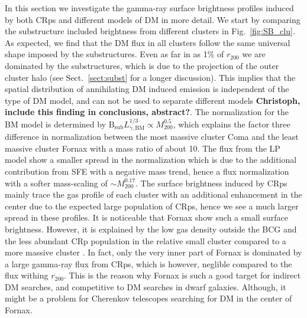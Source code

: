 \documentclass[10pt,aps,pra,reprint,amsmath,amsfonts,amssymb,showpacs,nofootinbib,floatfix]{revtex4-1}
\newcommand{\rmn}{\mathrm}
\newcommand{\B}{\rmn{B}}
\newcommand{\bsub}{\B_\rmn{sub}}
\newcommand{\rvir}{r_{200}}
\newcommand{\mvir}{M_{200}}
\begin{document}
In this section we investigate the gamma-ray surface brightness
profiles induced by both CRps and different models of DM in more
detail. We start by comparing the substructure included brightness
from different clusters in Fig.~\ref{fig:SB_clu}. As expected, we find
that the DM flux in all clusters follow the same universal shape
imposed by the substructures. Even as far in as 1\% of $\rvir$ we are
dominated by the substructures, which is due to the projection of the
outer cluster halo (see Sect.~\ref{sect:subst} for a longer
discussion). This implies that the spatial distribution of
annihilating DM induced emission is independent of the type of DM
model, and can not be used to separate different models {\bf
  Christoph, include this finding in conclusions, abstract?}. The
normalization for the BM model is determined by $\bsub
L_{\gamma,\rmn{BM}}^{1/3} \propto \mvir^{0.5}$, which explains the
factor three difference in normalization between the most massive
cluster Coma and the least massive cluster Fornax with a mass ratio of
about 10. The flux from the LP model show a smaller spread in the
normalization which is due to the additional contribution from SFE
with a negative mass trend, hence a flux normalization with a softer
mass-scaling of $\sim\mvir^{0.17}$. The surface brightness induced by
CRps mainly trace the gas profile of each cluster with an additional
enhancement in the center due to the expected large population of
CRps, hence we see a much larger spread in these profiles. It is
noticeable that Fornax show such a small surface brightness. However,
it is explained by the low gas density outside the BCG and the less
abundant CRp population in the relative small cluster compared to a
more massive cluster \cite{2010MNRAS.409..449P}. In fact, only the
very inner part of Fornax is dominated by a large gamma-ray flux from
CRps, which is however, neglible compared to the flux withing
$\rvir$. This is the reason why Fornax is such a good target for
indirect DM searches, and competitive to DM searches in dwarf
galaxies. Although, it might be a problem for Cherenkov telescopes
searching for DM in the center of Fornax.
\end{document}
